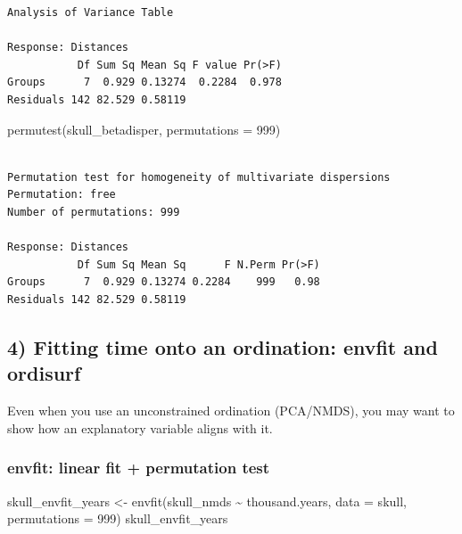 \documentclass[
  letterpaper,
  8pt,
  a4paper]{book}
\newenvironment{Shaded}{\begin{snugshade}}{\end{snugshade}}
\newcommand{\AttributeTok}[1]{\textcolor[rgb]{0.40,0.45,0.13}{#1}}
\newcommand{\DecValTok}[1]{\textcolor[rgb]{0.68,0.00,0.00}{#1}}
\newcommand{\FunctionTok}[1]{\textcolor[rgb]{0.28,0.35,0.67}{#1}}
\newcommand{\NormalTok}[1]{\textcolor[rgb]{0.00,0.23,0.31}{#1}}
\newcommand{\OtherTok}[1]{\textcolor[rgb]{0.00,0.23,0.31}{#1}}
\newcommand{\SpecialCharTok}[1]{\textcolor[rgb]{0.37,0.37,0.37}{#1}}
\begin{document}
\begin{verbatim}
Analysis of Variance Table

Response: Distances
           Df Sum Sq Mean Sq F value Pr(>F)
Groups      7  0.929 0.13274  0.2284  0.978
Residuals 142 82.529 0.58119               
\end{verbatim}

\begin{Shaded}
\begin{Highlighting}[]
\FunctionTok{permutest}\NormalTok{(skull\_betadisper, }\AttributeTok{permutations =} \DecValTok{999}\NormalTok{)}
\end{Highlighting}
\end{Shaded}

\begin{verbatim}

Permutation test for homogeneity of multivariate dispersions
Permutation: free
Number of permutations: 999

Response: Distances
           Df Sum Sq Mean Sq      F N.Perm Pr(>F)
Groups      7  0.929 0.13274 0.2284    999   0.98
Residuals 142 82.529 0.58119                     
\end{verbatim}

\subsection*{4) Fitting time onto an ordination: envfit and
ordisurf}\label{fitting-time-onto-an-ordination-envfit-and-ordisurf}

Even when you use an unconstrained ordination (PCA/NMDS), you may want
to show how an explanatory variable aligns with it.

\subsubsection*{envfit: linear fit + permutation
test}\label{envfit-linear-fit-permutation-test}

\begin{Shaded}
\begin{Highlighting}[]
\NormalTok{skull\_envfit\_years }\OtherTok{\textless{}{-}} \FunctionTok{envfit}\NormalTok{(skull\_nmds }\SpecialCharTok{\textasciitilde{}}\NormalTok{ thousand.years, }\AttributeTok{data =}\NormalTok{ skull, }\AttributeTok{permutations =} \DecValTok{999}\NormalTok{)}
\NormalTok{skull\_envfit\_years}
\end{Highlighting}
\end{Shaded}
\end{document}
